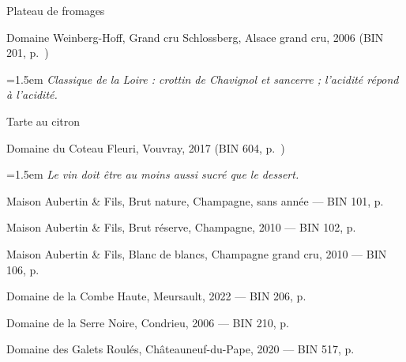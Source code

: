 \documentclass[11pt]{article}
\newcommand{\coeur}{{\color{accent}\faHeart}\ }
\begin{document}
\vspace{2.5mm}
{\large\color{rubrique} Plateau de fromages}\par
\hspace*{1.5em}Domaine Weinberg-Hoff, Grand cru Schlossberg, Alsace grand cru, 2006 {\footnotesize\color{doux}(BIN 201, p.~\pageref{l38bouteille})}\par
{\leftskip=1.5em\footnotesize\itshape\color{doux} Classique de la Loire : crottin de Chavignol et sancerre ; l'acidité répond à l'acidité.\par}
\vspace{2.5mm}
{\large\color{rubrique} Tarte au citron}\par
\hspace*{1.5em}Domaine du Coteau Fleuri, Vouvray, 2017 {\footnotesize\color{doux}(BIN 604, p.~\pageref{l34bouteille})}\par
{\leftskip=1.5em\footnotesize\itshape\color{doux} Le vin doit être au moins aussi sucré que le dessert.\par}
\vspace{2.5mm}
\vspace{6mm}\Needspace{6\baselineskip}{\centering\Large\color{rubrique} \coeur Nos coups de c\oe{}ur\par}\vspace{3mm}
Maison Aubertin \& Fils, Brut nature, Champagne, sans année {\footnotesize\color{doux}— BIN 101, p.~\pageref{l56bouteille}}\par\vspace{1mm}
Maison Aubertin \& Fils, Brut réserve, Champagne, 2010 {\footnotesize\color{doux}— BIN 102, p.~\pageref{l23bouteille}}\par\vspace{1mm}
Maison Aubertin \& Fils, Blanc de blancs, Champagne grand cru, 2010 {\footnotesize\color{doux}— BIN 106, p.~\pageref{l25bouteille}}\par\vspace{1mm}
Domaine de la Combe Haute, Meursault, 2022 {\footnotesize\color{doux}— BIN 206, p.~\pageref{l19bouteille}}\par\vspace{1mm}
Domaine de la Serre Noire, Condrieu, 2006 {\footnotesize\color{doux}— BIN 210, p.~\pageref{l32bouteille}}\par\vspace{1mm}
Domaine des Galets Roulés, Châteauneuf-du-Pape, 2020 {\footnotesize\color{doux}— BIN 517, p.~\pageref{l29bouteille}}\par\vspace{1mm}
\end{document}
